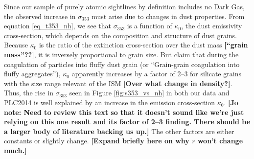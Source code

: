 \documentclass[preprint]{emulateapj}
\def\hi{H{\sc i}}
\def\s{s$^{-1}$}
\def\s353{$\sigma_{353}$}
\begin{document}
{\color{magenta} Since our sample of purely atomic sightlines by definition includes no Dark Gas, the observed increase in \s353 must arise due to changes in dust properties.} From equation \ref{eq_t353_nh}, {\color{magenta} we see that \s353 is a function of} $\kappa_{0}$, the dust emissivity cross-section, which depends on the composition and structure of dust grains. Because $\kappa_{0}$ is the ratio of the extinction cross-section over the dust mass \textbf{\color{magenta} [``grain mass''??]}, %
it is inversely proportional to grain size. %
But \cite{Kohler2012} claim that during the coagulation of particles into fluffy dust grain (or ``Grain-grain coagulation into fluffy aggregates''), $\kappa_{0}$ apparently increases by a factor of 2--3 for silicate grains with the size range relevant of the ISM \textbf{\color{magenta} [Over what change in density?]}. Thus, the rise in \s353 seen in Figure \ref{fig:s353_vs_nh} in both our data and PLC2014 %
is well explained by an increase in the emission cross-section $\kappa_{0}$. \textbf{\color{magenta} [Jo note: Need to review this text so that it doesn't sound like we're just relying on this one result and its factor of 2--3 finding. There should be a larger body of literature backing us up.]}
The other factors are either constants or slightly change. \textbf{\color{magenta} [Expand briefly here on why $r$ won't change much.]}%
\end{document}
